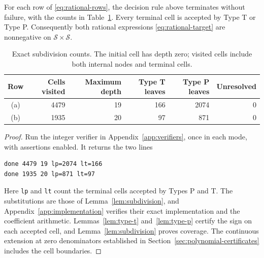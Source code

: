 \begin{proposition}\label{prop:finite-verification}
For each row of \eqref{eq:rational-rows}, the decision rule above terminates
without failure, with the counts in Table~\ref{tab:verification-counts}.
Every terminal cell is accepted by Type T or Type P.  Consequently both
rational expressions \eqref{eq:rational-target} are nonnegative on
$\mathcal S\times\mathcal S$.
\end{proposition}

\begin{table}[ht]
\centering
\begin{tabular}{c|r|r|r|r|r}
Row & Cells visited & Maximum depth & Type T leaves & Type P leaves & Unresolved\\
\hline
(a)&4479&19&166&2074&0\\
(b)&1935&20&97&871&0
\end{tabular}
\caption{Exact subdivision counts.  The initial cell has depth zero;
visited cells include both internal nodes and terminal cells.}
\label{tab:verification-counts}
\end{table}

\begin{proof}
Run the integer verifier in Appendix~\ref{app:verifiers}, once in each
mode, with assertions enabled.  It returns the two lines
\begin{verbatim}
done 4479 19 lp=2074 lt=166
done 1935 20 lp=871 lt=97
\end{verbatim}
Here \texttt{lp} and \texttt{lt} count the terminal cells accepted by
Types P and T.  The substitutions are those of Lemma~\ref{lem:subdivision},
and Appendix~\ref{app:implementation} verifies their exact implementation
and the coefficient arithmetic.  Lemmas~\ref{lem:type-t} and~\ref{lem:type-p} certify the sign on
each accepted cell, and Lemma~\ref{lem:subdivision} proves coverage.  The
continuous extension at zero denominators established in
Section~\ref{sec:polynomial-certificates} includes the cell boundaries.
\end{proof}

